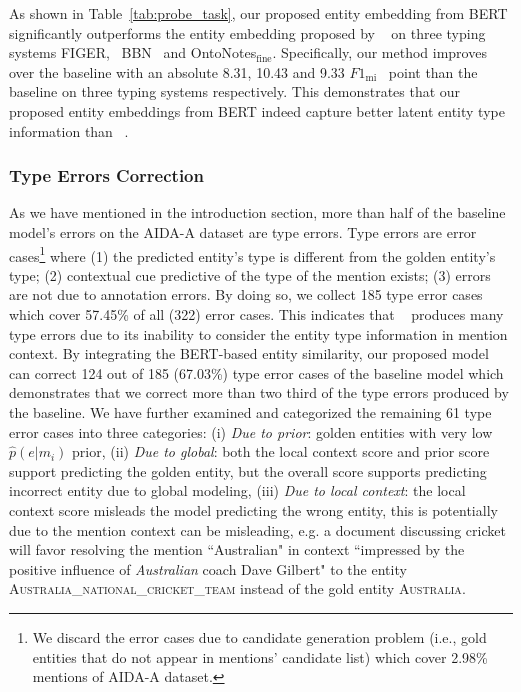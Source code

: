 \documentclass[letterpaper]{article} \usepackage{aaai20}  \usepackage{times}  \usepackage{helvet} \usepackage{courier}  \usepackage[hyphens]{url}  \usepackage{graphicx} \urlstyle{rm} \def\UrlFont{\rm}  \usepackage{graphicx}  \frenchspacing  \setlength{\pdfpagewidth}{8.5in}  \setlength{\pdfpageheight}{11in}  \usepackage{multirow}
\newcommand{\namecite}[1]{\citeauthor{#1}~\shortcite{#1}}
\newcommand{\figer}{{FIGER}}
\newcommand{\bbn}{{BBN}}
\newcommand{\ontonotesFine}{OntoNotes$_{\text{fine}}$}
\newcommand{\fOneMi}{$F1_{\text{mi}}$}
\begin{document}
As shown in Table~\ref{tab:probe_task}, our proposed entity embedding from BERT significantly outperforms the entity embedding proposed by \namecite{ganea2017deep} on three typing systems \figer, ~\bbn ~ and \ontonotesFine. Specifically, our method improves over the baseline with an absolute 8.31, 10.43 and 9.33 \fOneMi ~ point than the baseline on three typing systems respectively. This demonstrates that our proposed entity embeddings from BERT indeed capture better latent entity type information than \namecite{ganea2017deep}.

\subsubsection{Type Errors Correction}

As we have mentioned in the introduction section, more than half of the baseline model's errors on the AIDA-A dataset are type errors. Type errors are error cases\footnote{We discard the error cases due to candidate generation problem (i.e., gold entities that do not appear in mentions' candidate list) which cover 2.98\% mentions of AIDA-A dataset.} where (1) the predicted entity's type is different from the golden entity's type; (2) contextual cue predictive of the type of the mention exists; (3) errors are not due to annotation errors. By doing so, we collect 185 type error cases which cover 57.45\% of all (322) error cases. This indicates that \namecite{ganea2017deep} produces many type errors due to its inability to consider the entity type information in mention context. By integrating the BERT-based entity similarity, our proposed model can correct 124 out of 185 (67.03\%) type error cases of the baseline model which demonstrates that we correct more than two third of the type errors produced by the baseline. We have further examined and categorized the remaining 61 type error cases into three categories: (i) {\em Due to prior}: golden entities with very low $\hat{p}(e|m_i)$ prior, (ii) {\em Due to global}: both the local context score and prior score support predicting the golden entity, but the overall score supports predicting incorrect entity due to global modeling, (iii) {\em Due to local context}: the local context score misleads the model predicting the wrong entity, this is potentially due to the mention context can be misleading, e.g. a document discussing cricket will favor resolving the mention ``Australian" in context ``impressed by the positive influence of {\em Australian} coach Dave Gilbert" to the entity \textsc{Australia\_national\_cricket\_team} instead of the gold entity \textsc{Australia}. 
\end{document}
